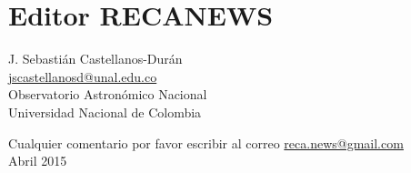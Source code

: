 			\section*{Editor RECANEWS}
  
\begin{flushright}
J. Sebastián Castellanos-Durán\\
\url{jscastellanosd@unal.edu.co}\\
Observatorio Astronómico Nacional\\
Universidad Nacional de Colombia
\end{flushright}
\begin{flushright}
Cualquier comentario por favor escribir al correo  \url{reca.news@gmail.com}\\
Abril 2015
\end{flushright}


